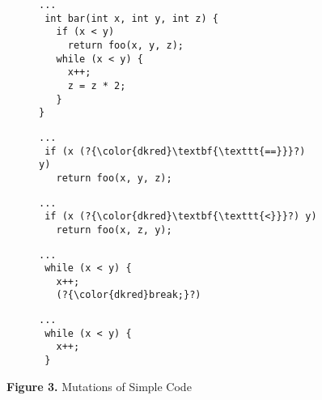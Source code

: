 \begin{figure}[h!]
\begin{subfigure}{.65\columnwidth}
\begin{lstlisting}[basicstyle=\scriptsize\ttfamily,numbers=none,xleftmargin=0.7em,xrightmargin=.7em]
...
 int bar(int x, int y, int z) {
   if (x < y)
     return foo(x, y, z);
   while (x < y) {
     x++;
     z = z * 2;
   }
}
\end{lstlisting}
\end{subfigure}
\begin{subfigure}{.45\columnwidth}
\begin{lstlisting}[basicstyle=\scriptsize\ttfamily,numbers=none,xleftmargin=0.7em,xrightmargin=.7em]
...
 if (x (?{\color{dkred}\textbf{\texttt{==}}}?) y)
   return foo(x, y, z);
\end{lstlisting}
\end{subfigure}
\hspace{.2em}
\begin{subfigure}{.45\columnwidth}
\begin{lstlisting}[basicstyle=\scriptsize\ttfamily,numbers=none,xleftmargin=0.7em,xrightmargin=.7em]
...
 if (x (?{\color{dkred}\textbf{\texttt{<}}}?) y)
   return foo(x, z, y);
\end{lstlisting}
\end{subfigure}
\begin{subfigure}{.45\columnwidth}
\begin{lstlisting}[basicstyle=\scriptsize\ttfamily,numbers=none,xleftmargin=0.7em,xrightmargin=.7em]
...
 while (x < y) {
   x++;
   (?{\color{dkred}break;}?)
\end{lstlisting}
\end{subfigure}
\hspace{.2em}
\begin{subfigure}{.45\columnwidth}
\begin{lstlisting}[basicstyle=\scriptsize\ttfamily,numbers=none,xleftmargin=0.7em,xrightmargin=.7em]
...
 while (x < y) {
   x++; 
 }
\end{lstlisting}
\end{subfigure}
\label{fig:fopexample}
\caption*{\normalsize\textbf{Figure 3.} Mutations of  Simple Code} %
\end{figure}

